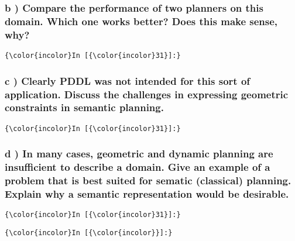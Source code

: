 \documentclass{article}
\begin{document}
    \subsubsection{b ) Compare the performance of two planners on this domain. Which one
works better? Does this make sense, why?}


    \begin{Verbatim}[commandchars=\\\{\}]
{\color{incolor}In [{\color{incolor}31}]:} 
\end{Verbatim}


    \subsubsection{c ) Clearly PDDL was not intended for this sort of application. Discuss
the challenges in expressing geometric constraints in semantic planning.}


    \begin{Verbatim}[commandchars=\\\{\}]
{\color{incolor}In [{\color{incolor}31}]:} 
\end{Verbatim}


    \subsubsection{d ) In many cases, geometric and dynamic planning are insufficient to
describe a domain. Give an example of a problem that is best suited for
sematic (classical) planning. Explain why a semantic representation
would be desirable.}


    \begin{Verbatim}[commandchars=\\\{\}]
{\color{incolor}In [{\color{incolor}31}]:} 
\end{Verbatim}

    \begin{Verbatim}[commandchars=\\\{\}]
{\color{incolor}In [{\color{incolor}}]:} 
\end{Verbatim}


    
    
    
    
\end{document}
